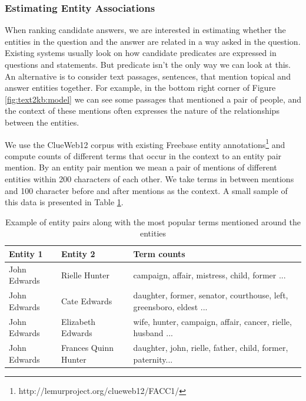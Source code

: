 \subsubsection{Estimating Entity Associations}
\label{subsubsec:text2kb:method:clueweb}

When ranking candidate answers, we are interested in estimating whether the entities in the question and the answer are related in a way asked in the question.
Existing systems usually look on how candidate predicates are expressed in questions and statements.
But predicate isn't the only way we can look at this. An alternative is to consider text passages, \eg sentences, that mention topical and answer entities together.
For example, in the bottom right corner of Figure \ref{fig:text2kb:model} we can see some passages that mentioned a pair of people, and the context of these mentions often expresses the nature of the relationships between the entities.

We use the ClueWeb12 corpus with existing Freebase entity annotations\footnote{http://lemurproject.org/clueweb12/FACC1/} and compute counts of different terms that occur in the context to an entity pair mention.
By an entity pair mention we mean a pair of mentions of different entities within 200 characters of each other.
We take terms in between mentions and 100 character before and after mentions as the context.
A small sample of this data is presented in Table \ref{table:text2kb:clueweb_entitypairs_langmodel}.

\begin{table}
\centering
\caption{Example of entity pairs along with the most popular terms mentioned around the entities}
\label{table:text2kb:clueweb_entitypairs_langmodel}
\begin{tabular}{| p{4cm} | p{4cm} | p{8cm} |}
\hline
Entity 1 & Entity 2 & Term counts\\
\hline
John Edwards & Rielle Hunter & campaign, affair, mistress, child, former ...\\
\hline
John Edwards & Cate Edwards & daughter, former, senator, courthouse, left, greensboro, eldest ...\\
\hline
John Edwards & Elizabeth Edwards & wife, hunter, campaign, affair, cancer, rielle, husband ...\\
\hline
John Edwards & Frances Quinn Hunter & daughter, john, rielle, father, child, former, paternity...\\
\hline
\end{tabular}
\end{table}

